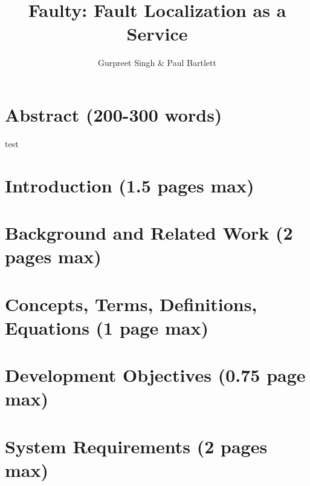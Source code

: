\documentclass[journal=jacsat,manuscript=article]{achemso}
\author{Gurpreet Singh \& Paul Bartlett}
\title[the Title]
  {Faulty: Fault Localization as a Service}
\begin{document}



\hypertarget{abstract-200-300-words}{%
\section{Abstract (200-300 words)}\label{abstract-200-300-words}}

test

\hypertarget{introduction-1.5-pages-max}{%
\section{Introduction (1.5 pages
max)}\label{introduction-1.5-pages-max}}

\hypertarget{background-and-related-work-2-pages-max}{%
\section{Background and Related Work (2 pages
max)}\label{background-and-related-work-2-pages-max}}

\hypertarget{concepts-terms-definitions-equations-1-page-max}{%
\section{Concepts, Terms, Definitions, Equations (1 page
max)}\label{concepts-terms-definitions-equations-1-page-max}}

\hypertarget{development-objectives-0.75-page-max}{%
\section{Development Objectives (0.75 page
max)}\label{development-objectives-0.75-page-max}}

\hypertarget{system-requirements-2-pages-max}{%
\section{System Requirements (2 pages
max)}\label{system-requirements-2-pages-max}}
\end{document}
